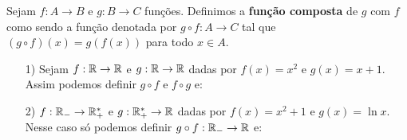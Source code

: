 \documentclass{beamer}
\begin{document}
    \begin{frame}
        \begin{definicao}
            Sejam $f : A \to B$ e $g : B \to C$ fun\c{c}\~oes. Definimos a \textbf{fun\c{c}\~ao composta} de $g$ com $f$ como sendo a fun\c{c}\~ao denotada por $g \circ f : A \to C$ tal que $(g\circ f)(x) = g(f(x))$ para todo $x \in A$.
        \end{definicao}

        \vspace{5cm}
    \end{frame}

    \begin{frame}
        \begin{exemplos}
            \begin{enumerate}
                \item[1)] Sejam $f : \mathbb{R} \to \mathbb{R}$ e $g : \mathbb{R} \to \mathbb{R}$ dadas por $f(x) = x^2$ e $g(x) = x + 1$. Assim podemos definir $g \circ f$ e $f \circ g$ e:
            \end{enumerate}
        \end{exemplos}

        \vspace{5cm}
    \end{frame}
    
    \begin{frame}
        \vspace{5cm}    
    \end{frame}

    \begin{frame}
        \begin{exemplos}
            \begin{enumerate}
                \item[2)] $f : \mathbb{R}_- \to \mathbb{R}^*_+$ e $g : \mathbb{R}^*_+ \to \mathbb{R}$ dadas por $f(x) = x^2 + 1$ e $g(x) = \ln x$. Nesse caso s\'o podemos definir $g \circ f : \mathbb{R}_- \to \mathbb{R}$ e:
            \end{enumerate}
        \end{exemplos}

        \vspace{5cm}
    \end{frame}

    \begin{frame}
        \vspace{5cm}
    \end{frame}
\end{document}
